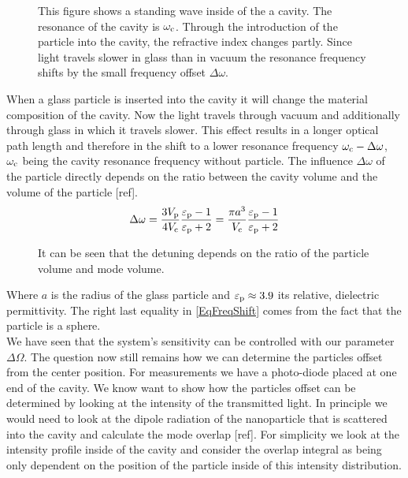 \begin{figure}[H]
	
	\caption{This figure shows a standing wave inside of the a cavity. The resonance of the cavity is $\de{\omega}{c}$. Through the introduction of the particle into the cavity, the refractive index changes partly. Since light travels slower in glass than in vacuum the resonance frequency shifts by the small frequency offset $\Delta\omega$.}
	\label{fig:CavityDetection}
\end{figure}

When a glass particle is inserted into the cavity it will change the material composition of the cavity. Now the light travels through vacuum and additionally through glass in which it travels slower. This effect results in a longer optical path length and therefore in the shift to a lower resonance frequency $\de{\omega}{c}-\Delta\omega$, $\de{\omega}{c}$ being the cavity resonance frequency without particle. The influence $\Delta\omega$ of the particle directly depends on the ratio between the cavity volume and the volume of the particle [ref].
\begin{equation}\label{EqFreqShift}
	\Delta\omega=\frac{3\de{V}{p}}{4\de{V}{c}}\frac{\de{\varepsilon}{p}-1}{\de{\varepsilon}{p}+2}=\frac{\pi a^3}{\de{V}{c}}\frac{\de{\varepsilon}{p}-1}{\de{\varepsilon}{p}+2}
\end{equation}
\begin{figure}[H]
	
	\caption{It can be seen that the detuning depends on the ratio of the particle volume and mode volume.}
\end{figure}
Where $a$ is the radius of the glass particle and $\de{\varepsilon}{p}\approx 3.9$ its relative, dielectric permittivity. The right last equality in \autoref{EqFreqShift} comes from the fact that the particle is a sphere.\\
We have seen that the system's sensitivity can be controlled with our parameter $\Delta\Omega$. The question now still remains how we can determine the particles offset from the center position. For measurements we have a photo-diode placed at one end of the cavity. We know want to show how the particles offset can be determined by looking at the intensity of the transmitted light. In principle we would need to look at the dipole radiation of the nanoparticle that is scattered into the cavity and calculate the mode overlap [ref]. For simplicity we look at the intensity profile inside of the cavity and consider the overlap integral as being only dependent on the position of the particle inside of this intensity distribution.

